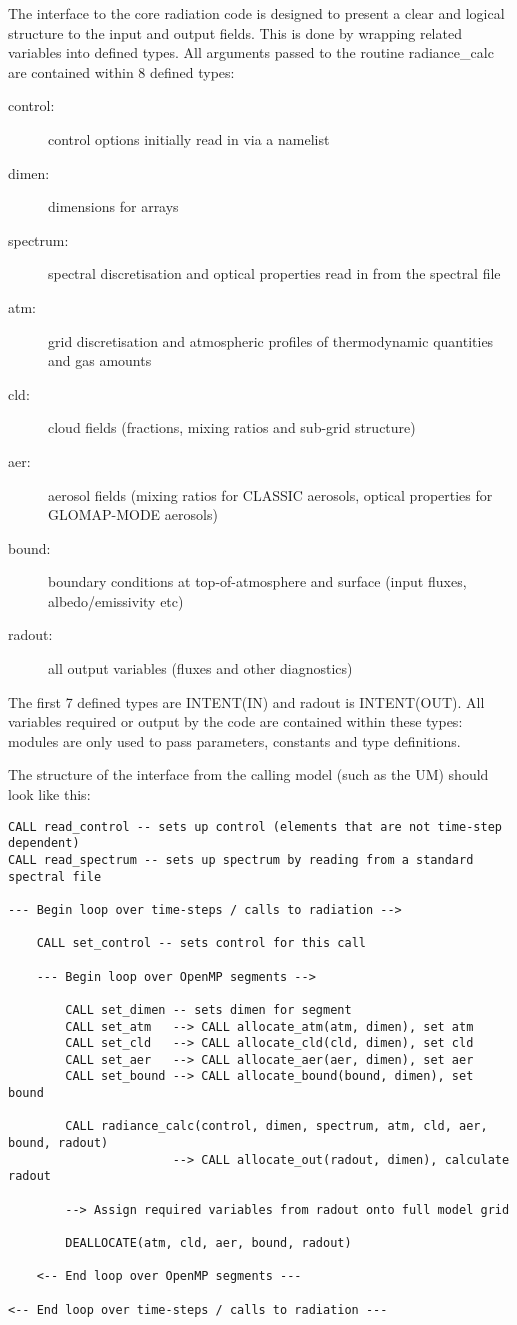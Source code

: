 
The interface to the core radiation code is designed to present a clear and logical structure to the input and output fields. This is done by wrapping related variables into defined types. All arguments passed to the routine radiance\_calc are contained within 8 defined types:

\begin{description}
\item[control:] control options initially read in via a namelist
\item[dimen:] dimensions for arrays
\item[spectrum:] spectral discretisation and optical properties read in from the spectral file
\item[atm:] grid discretisation and atmospheric profiles of thermodynamic quantities and gas amounts
\item[cld:] cloud fields (fractions, mixing ratios and sub-grid structure)
\item[aer:] aerosol fields (mixing ratios for CLASSIC aerosols, optical properties for GLOMAP-MODE aerosols)
\item[bound:] boundary conditions at top-of-atmosphere and surface (input fluxes, albedo/emissivity etc)
\item[radout:] all output variables (fluxes and other diagnostics)
\end{description}

The first 7 defined types are INTENT(IN) and radout is INTENT(OUT). All variables required or output by the code are contained within these types: modules are only used to pass parameters, constants and type definitions.

The structure of the interface from the calling model (such as the UM) should look like this:

\begin{verbatim}
CALL read_control -- sets up control (elements that are not time-step dependent)
CALL read_spectrum -- sets up spectrum by reading from a standard spectral file

--- Begin loop over time-steps / calls to radiation -->

    CALL set_control -- sets control for this call

    --- Begin loop over OpenMP segments -->

        CALL set_dimen -- sets dimen for segment
        CALL set_atm   --> CALL allocate_atm(atm, dimen), set atm
        CALL set_cld   --> CALL allocate_cld(cld, dimen), set cld
        CALL set_aer   --> CALL allocate_aer(aer, dimen), set aer
        CALL set_bound --> CALL allocate_bound(bound, dimen), set bound

        CALL radiance_calc(control, dimen, spectrum, atm, cld, aer, bound, radout)
                       --> CALL allocate_out(radout, dimen), calculate radout

        --> Assign required variables from radout onto full model grid

        DEALLOCATE(atm, cld, aer, bound, radout)

    <-- End loop over OpenMP segments ---

<-- End loop over time-steps / calls to radiation ---
\end{verbatim}

